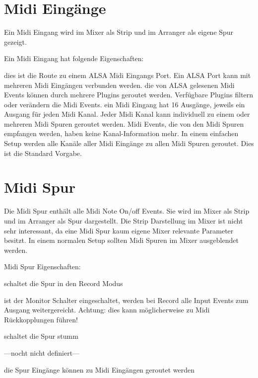   \section{Midi Eingänge}
      Ein Midi Eingang wird im Mixer als Strip und im Arranger als
      eigene Spur gezeigt.

      Ein Midi Eingang hat folgende Eigenschaften:

      \blank[big]
       dies ist die Route zu einem ALSA Midi Eingangs
         Port. Ein ALSA Port kann mit mehreren Midi Eingängen verbunden
         werden.
       die von ALSA gelesenen Midi Events können durch
         mehrere Plugins geroutet werden. Verfügbare Plugins filtern oder
         verändern die Midi Events.
       ein Midi Eingang hat 16 Ausgänge, jeweils ein
         Ausgang für jeden Midi Kanal. Jeder Midi Kanal kann individuell
         zu einem oder mehreren Midi Spuren geroutet werden.
         Midi Events, die von den Midi Spuren empfangen werden, haben
         keine Kanal-Information mehr.
         In einem einfachen Setup werden alle Kanäle aller Midi Eingänge
         zu allen Midi Spuren geroutet. Dies ist die Standard Vorgabe.
         \par

      \blank[big]

  \section{Midi Spur}
      Die Midi Spur enthält alle Midi Note On/off Events. Sie wird im
      Mixer als Strip und im Arranger als Spur dargestellt. Die
      Strip Darstellung im Mixer ist nicht sehr interessant, da eine
      Midi Spur kaum eigene Mixer relevante Parameter besitzt. In einem 
      normalen Setup sollten Midi Spuren im Mixer ausgeblendet werden.

      Midi Spur Eigenschaften:

      \blank[big]
       schaltet die Spur in den Record Modus

       ist der Monitor Schalter eingeschaltet, werden
            bei Record alle Input Events zum Ausgang weitergereicht.
            Achtung: dies kann möglicherweise zu Midi Rückkopplungen
            führen!

       schaltet die Spur stumm

       ---nocht nicht definiert---

       die Spur Eingänge können zu Midi Eingängen
            geroutet werden

